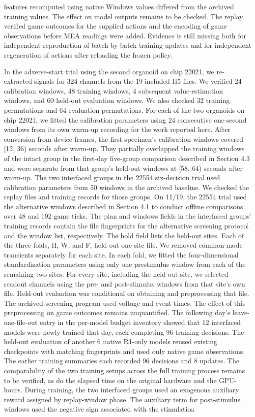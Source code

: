 \documentclass{article}
\begin{document}
features recomputed using native Windows values differed from the archived training values. The effect on model outputs remains to be checked. The replay verified game outcomes for the supplied actions and the encoding of game observations before MEA readings were added. Evidence is still missing both for independent reproduction of batch-by-batch training updates and for independent regeneration of actions after reloading the frozen policy.


In the adverse-start trial using the second organoid on chip 22021, we re-extracted signals for 324 channels from the 19 included H5 files. We verified 24 calibration windows, 48 training windows, 4 subsequent value-estimation windows, and 60 held-out evaluation windows. We also checked 32 training permutations and 64 evaluation permutations. For each of the two organoids on chip 22021, we fitted the calibration parameters using 24 consecutive one-second windows from its own warm-up recording for the work reported here. After conversion from device frames, the first specimen's calibration windows covered [12, 36) seconds after warm-up. They partially overlapped the training windows of the intact group in the first-day five-group comparison described in Section 4.3 and were separate from that group's held-out windows at [58, 64) seconds after warm-up. The two interfaced groups in the 22554 six-decision trial used calibration parameters from 50 windows in the archived baseline. We checked the replay files and training records for those groups. On 11/19, the 22554 trial used the alternative windows described in Section 4.1 to conduct offline comparisons over 48 and 192 game ticks. The plan and windows fields in the interfaced groups' training records contain the file fingerprints for the alternative screening protocol and the window list, respectively. The hold field lists the held-out sites. Each of the three folds, H, W, and F, held out one site file. We removed common-mode transients separately for each site. In each fold, we fitted the four-dimensional standardization parameters using only one prestimulus window from each of the remaining two sites. For every site, including the held-out site, we selected readout channels using the pre- and post-stimulus windows from that site's own file. Held-out evaluation was conditional on obtaining and preprocessing that file. The archived screening program used voltage and event times. The effect of this preprocessing on game outcomes remains unquantified. The following day's leave-one-file-out entry in the per-model budget inventory showed that 12 interfaced models were newly trained that day, each completing 96 training decisions. The held-out evaluation of another 6 native R1-only models reused existing checkpoints with matching fingerprints and used only native game observations. The earlier training summaries each recorded 96 decisions and 8 updates. The comparability of the two training setups across the full training process remains to be verified, as do the elapsed time on the original hardware and the GPU-hours. During training, the two interfaced groups used an exogenous auxiliary reward assigned by replay-window phase. The auxiliary term for post-stimulus windows used the negative sign associated with the stimulation 
\end{document}
